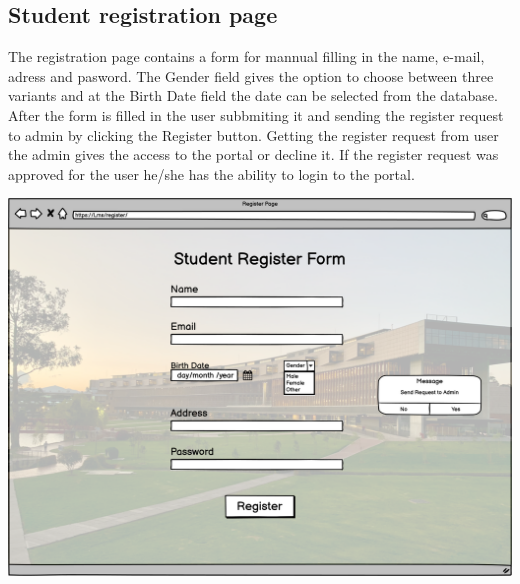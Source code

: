 \subsection{Student registration page}
  
The registration page contains a form for mannual filling in the name, e-mail, adress and pasword. The Gender field gives the option to choose between three variants and at the Birth Date field the date can be selected from the database. After the form is filled in the user subbmiting it and sending the register request to admin by clicking the Register button. Getting the register request from user the admin gives the access to the portal or decline it. If the register request was approved for the user he/she has the ability to login to the portal.  

\includegraphics[width=\columnwidth]{images/StudentRegisterForm.png}